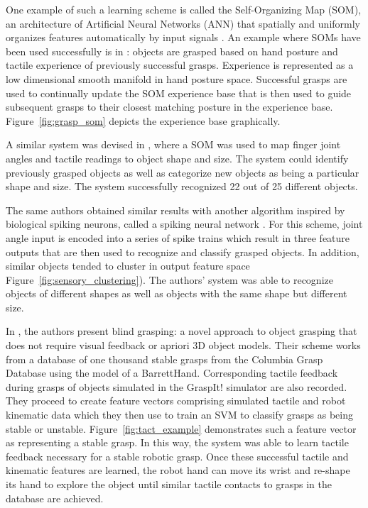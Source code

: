 One example of such a learning scheme is called the Self-Organizing Map (SOM), an architecture of Artificial Neural Networks (ANN) that spatially and uniformly organizes features automatically by input signals \cite{kohonen1990self}.
An example where SOMs have been used successfully is in \cite{steffen2007experience}: objects are grasped based on hand posture and tactile experience of previously successful grasps.
Experience is represented as a low dimensional smooth manifold in hand posture space. 
Successful grasps are used to continually update the SOM experience base that is then used to guide subsequent grasps to their closest matching posture in the experience base.
Figure~\ref{fig:grasp_som} depicts the experience base graphically.

A similar system was devised in \cite{ratnasingam2011object}, where a SOM was used to map finger joint angles and tactile readings to object shape and size.
The system could identify previously grasped objects as well as categorize new objects as being a particular shape and size.
The system successfully recognized 22 out of 25 different objects.

The same authors obtained similar results with another algorithm inspired by biological spiking neurons, called a spiking neural network \cite{ratnasingam2011spiking}.
For this scheme, joint angle input is encoded into a series of spike trains which result in three feature outputs that are then used to recognize and classify grasped objects.
In addition, similar objects tended to cluster in output feature space Figure~\ref{fig:sensory_clustering}).
The authors' system was able to recognize objects of different shapes as well as objects with the same shape but different size.

In \cite{dang2011blind}, the authors present blind grasping: a novel approach to object grasping that does not require visual feedback or apriori 3D object models.
Their scheme works from a database of one thousand stable grasps from the Columbia Grasp Database using the model of a BarrettHand. 
Corresponding tactile feedback during grasps of objects simulated in the GraspIt! simulator are also recorded.
They proceed to create feature vectors comprising simulated tactile and robot kinematic data which they then use to train an SVM to classify grasps as being stable or unstable. 
Figure~\ref{fig:tact_example} demonstrates such a feature vector as representing a stable grasp.
In this way, the system was able to learn tactile feedback necessary for a stable robotic grasp.
Once these successful tactile and kinematic features are learned, the robot hand can move its wrist and re-shape its hand to explore the object until similar tactile contacts to grasps in the database are achieved.


